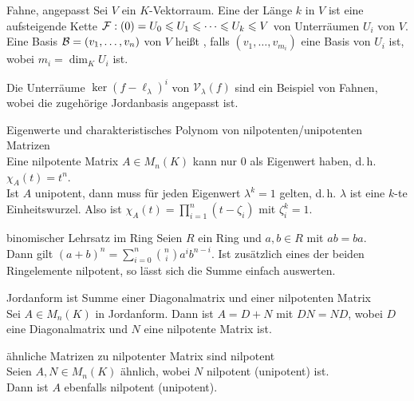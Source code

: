 \begin{Def}{Fahne, angepasst}
    Sei $V$ ein $K$-Vektorraum.
    Eine  der Länge $k$ in $V$ ist eine aufsteigende
    Kette $\mathcal{F}: (0) = U_0 \leqslant U_1 \leqslant \dotsb \leqslant U_k \leqslant V$ von
    Unterräumen $U_i$ von $V$. \\
    Eine Basis $\mathcal{B} = (v_1, \dotsc, v_n)$ von $V$ heißt
    , falls
    $(v_1, \dotsc, v_{m_i})$ eine Basis von $U_i$ ist, wobei
    $m_i = \dim_K U_i$ ist.
\end{Def}

Die Unterräume $\ker(f - \ell_\lambda)^i$ von $\mathcal{V}_\lambda(f)$
sind ein Beispiel von Fahnen, wobei die zugehörige Jordanbasis angepasst ist.

\begin{Lemma}{Eigenwerte und charakteristisches Polynom von
             nilpotenten/unipotenten Matrizen} \\
    Eine nilpotente Matrix $A \in M_n(K)$ kann nur $0$ als Eigenwert haben,
    d.\,h. $\chi_A(t) = t^n$. \\
    Ist $A$ unipotent, dann muss für jeden Eigenwert $\lambda^k = 1$ gelten,
    d.\,h. $\lambda$ ist eine $k$-te Einheitswurzel.
    Also ist $\chi_A(t) = \prod_{i=1}^n (t - \zeta_i)$ mit $\zeta_i^k = 1$.
\end{Lemma}

\begin{Lemma}{binomischer Lehrsatz im Ring}
    Seien $R$ ein Ring und $a, b \in R$ mit $ab = ba$. \\
    Dann gilt $(a + b)^n = \sum_{i=0}^n \binom{n}{i} a^i b^{n-i}$.
    Ist zusätzlich eines der beiden Ringelemente nilpotent, so lässt
    sich die Summe einfach auswerten.
\end{Lemma}

\begin{Lemma}{Jordanform ist Summe einer Diagonalmatrix und einer
              nilpotenten Matrix} \\
    Sei $A \in M_n(K)$ in Jordanform.
    Dann ist $A = D + N$ mit $DN = ND$, wobei $D$ eine Diagonalmatrix und
    $N$ eine nilpotente Matrix ist.
\end{Lemma}

\begin{Lemma}{ähnliche Matrizen zu nilpotenter Matrix sind nilpotent} \\
    Seien $A, N \in M_n(K)$ ähnlich, wobei $N$ nilpotent (unipotent) ist. \\
    Dann ist $A$ ebenfalls nilpotent (unipotent).
\end{Lemma}

